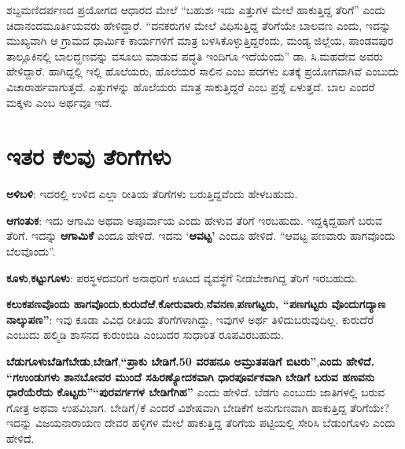 ಶಬ್ದಮಣಿದರ್ಪಣದ ಪ್ರಯೋಗದ ಆಧಾರದ ಮೇಲೆ “ಬಹುಶಃ ಇದು ಎತ್ತುಗಳ ಮೇಲೆ ಹಾಕುತ್ತಿದ್ದ ತೆರಿಗೆ” ಎಂದು ಚಿದಾನಂದಮೂರ್ತಿಯವರು ಹೇಳಿದ್ದಾರೆ. “ದನಕರುಗಳ ಮೇಲೆ ವಿಧಿಸುತ್ತಿದ್ದ ತೆರಿಗೆಯೇ ಬಾಲವಣ ಎಂದು, ಇದನ್ನು ಮುಖ್ಯವಾಗಿ ಆ ಗ್ರಾಮದ ಧಾರ್ಮಿಕ ಕಾರ್ಯಗಳಿಗೆ ಮಾತ್ರ ಬಳಸಿಕೊಳ್ಳುತ್ತಿದ್ದರೆಂದು, ಮಂಡ್ಯ ಜಿಲ್ಲೆಯ, ಪಾಂಡವಪುರ ತಾಲ್ಲೂಕಿನಲ್ಲಿ ಬಾಲದ್ಹಣವನ್ನು ವಸೂಲು ಮಾಡುವ ಪದ್ಧತಿ ಇಂದಿಗೂ ಇದೆಯೆಂದು” ಡಾ. ಸಿ.ಮಹದೇವ ಅವರು ಹೇಳಿದ್ದಾರೆ. ಹಾಗಿದ್ದಲ್ಲಿ ಇಲ್ಲಿ ಹೊಲೆಯರು, ಹೊಲೆಯರ ಸಾಲಿನ ಎಂಬ ಪದಗಳು ಏತಕ್ಕೆ ಪ್ರಯೋಗವಾಗಿವೆ ಎಂಬುದು ವಿಚಾರಾರ್ಹವಾಗುತ್ತದೆ. ಎತ್ತುಗಳನ್ನು ಹೊಲೆಯರು ಮಾತ್ರ ಸಾಕುತ್ತಿದ್ದರೆ ಎಂಬ ಪ್ರಶ್ನೆ ಏಳುತ್ತದೆ. ಬಾಲ ಎಂದರೆ ಮಕ್ಕಳು ಎಂಬ ಅರ್ಥವೂ ಇದೆ.


\section{ಇತರ ಕೆಲವು ತೆರಿಗೆಗಳು}

\textbf{ಅಳಿಬಳಿ}: ಇದರಲ್ಲಿ ಉಳಿದ ಎಲ್ಲಾ ರೀತಿಯ ತೆರಿಗೆಗಳು ಬರುತ್ತಿದ್ದವೆಂದು ಹೇಳಬಹುದು.

\textbf{ಆಗಂತುಕ}: ಇದು ಆಗಾಮಿ ಅಥವಾ ಅಪೂರ್ವಾಯ ಎಂದು ಹೇಳುವ ತೆರಿಗೆ ಇರಬಹುದು. ಇದ್ದಕ್ಕಿದ್ದಹಾಗೆ ಬರುವ ತೆರಿಗೆ. ಇದನ್ನು \textbf{ಆಗಾಮಿಕೆ} ಎಂದೂ ಹೇಳಿದೆ. ಇದನು ‘\textbf{ಆವಟ್ಟ’ }ಎಂದೂ ಹೇಳಿದೆ. “ಆವಟ್ಟ ಪಣವಾರು ಹಾಗವೊಂದು ಬೆಲವೊಂದು”.

\textbf{ಕೂಳು},\textbf{ಕಟ್ಟುಗೂಳು}: ಪರಸ್ಥಳದವರಿಗೆ ಅನಾಥರಿಗೆ ಊಟದ ವ್ಯವಸ್ಥೆಗೆ ನೀಡಬೇಕಾಗಿದ್ದ ತೆರಿಗೆ ಇರಬಹುದು.

\textbf{ಕಲುಕಪಣವೊಂದು ಹಾಗವೊಂದು},\textbf{ಕುರುದೆಱೆ},\textbf{ಕೋರುವಾರು},\textbf{ನೆವನಣ},\textbf{ಪಣಗಟ್ಟರು, “ಪಣಗಟ್ಟರು ವೊಂದುಗದ್ಯಾಣ ನಾಲ್ಕುಪಣ”}: ಇವು ಕೂಡಾ ವಿವಿಧ ರೀತಿಯ ತೆರಿಗೆಗಳಾಗಿದ್ದು, ಇವುಗಳ ಅರ್ಥ ತಿಳಿದುಬರುವುದಿಲ್ಲ. ಕುರುದೆರೆ ಎಂಬುದು ಹಲ್ಮಿಡಿ ಶಾಸನದ ಕುರುಂಬಿಡಿ ಎಂಬುದರ ಸುಧಾರಿತ ರೂಪವಿರಬಹುದು. 

\textbf{ಬೆಡುಗೂಳು}\textbf{ಬೆಡಿಗೆ}\textbf{ಬೇಡು},\textbf{ಬೇಡಿಗೆ},\textbf{“ಪ್ರಾಕು ಬೇಡಿಗೆ.50 ವರಹನೂ ಅಮ್ರುತಪಡಿಗೆ ಬಿಟರು”},\textbf{ಎಂದು ಹೇಳಿದೆ. “ಗಉಂಡುಗಳು ಶಾನಬೋವರ ಮುಂದೆ ಸಹಿರಣ್ಯೋದಕವಾಗಿ ಧಾರಪೂರ್ವಕವಾಗಿ ಬೇಡಿಗೆ ಬರುವ ಹಣವನು ಧಾರೆಯೆರೆದು ಕೊಟ್ಟರು”}\textbf{“ಪುರವರ್ಗಗಳ ಬೇಡಿಗೆಗಿಹ”} ಎಂದು ಹೇಳಿದೆ. ಬೆಡಗು ಎಂಬುದು ಜಾತಿಗಳಲ್ಲಿ ಬರುವ ಗೋತ್ರ ಅಥವಾ ಉಪವಿಭಾಗ. ಬೇಡಿಗೆ/ಕೆ ಎಂದರೆ ವಿಶೇಷವಾಗಿ ಬೇಡಿಕೆಗೆ ಅನುಗುಣವಾಗಿ ಹಾಕುತ್ತಿದ್ದ ತೆರಿಗೆಯೇ? ಇದನ್ನು ವಿಜಯನಾರಾಯಣ ದೇವರ ಹಳ್ಳಿಗಳ ಮೇಲೆ ಹಾಕುತ್ತಿದ್ದ ತೆರಿಗೆಯ ಪಟ್ಟಿಯಲ್ಲಿ ಸೇರಿಸಿ ಬೆಡುಂಗೊಳು ಎಂದು ಹೇಳಿದೆ.


